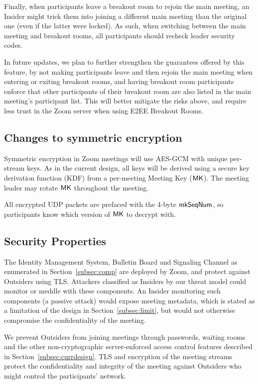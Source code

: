 Finally, when participants leave a breakout room to rejoin the main meeting, an Insider might trick
them into joining a different main meeting than the original one (even if the latter were locked).
As such, when switching between the main meeting and breakout rooms, all participants should recheck
leader security codes.

In future updates, we plan to further strengthen the guarantees offered by this feature, by not
making participants leave and then rejoin the main meeting when entering or exiting breakout rooms,
and having breakout room participants enforce that other participants of their breakout room are
also listed in the main meeting’s participant list. This will better mitigate the risks above, and
require less trust in the Zoom server when using E2EE Breakout Rooms.

\subsection{Changes to symmetric encryption}
Symmetric encryption in Zoom meetings will use AES-GCM with unique per-stream keys. As in the current design, all keys will be derived using a secure key derivation function (KDF) from a per-meeting Meeting Key (${\sf MK}$). The meeting leader may rotate ${\sf MK}$ throughout the meeting.

All encrypted UDP packets are prefaced with the 4-byte $\mathsf{mkSeqNum}$, so participants know which version of ${\sf MK}$ to decrypt with.

\subsection{Security Properties}
\label{subsec:secprop}
The Identity Management System, Bulletin Board and Signaling Channel as enumerated in
Section~\ref{subsec:comp} are deployed by Zoom, and protect against Outsiders using TLS. Attackers
classified as Insiders by our threat model could monitor or meddle with these components. An Insider
monitoring such components (a passive attack) would expose meeting metadata, which is stated as a
limitation of the design in Section~\ref{subsec:limit}, but would not otherwise compromise the
confidentiality of the meeting.

We prevent Outsiders from joining meetings through passwords, waiting rooms and the other
non-cryptographic server-enforced access control features described in
Section~\ref{subsec:currdesign}. TLS and encryption of the meeting streams protect the
confidentiality and integrity of the meeting against Outsiders who might control the participants'
network.

